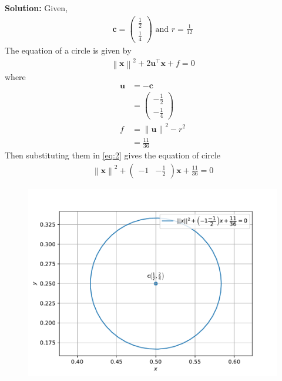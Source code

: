 \documentclass[12pt]{article}
\providecommand{\norm}[1]{\left\lVert#1\right\rVert}
\newcommand{\solution}{\noindent \textbf{Solution: }}
\newcommand{\myvec}[1]{\ensuremath{\begin{pmatrix}#1\end{pmatrix}}}
\let\vec\mathbf
\begin{document}
\begin{enumerate}
\solution Given,
		\begin{align}
			\vec{c}=\myvec{\frac{1}{2}\\[2pt] \frac{1}{4}}\text{ and }r=\frac{1}{12}
		\end{align}
		The equation of a circle is given by
		\begin{align}                                                                                          \norm{\vec{x}}^2 +2\vec{u}^\top\vec{x}+f=0 \label{eq:2}                                                                                  \end{align}
where
\begin{align}
	\vec{u}&=\vec{-c}\\
	&=\myvec{-\frac{1}{2}\\[2pt] -\frac{1}{4}}\\
	f&=\norm{\vec{u}}^2 -r^2\\
	&=\frac{11}{36}
\end{align}
		Then substituting them in \eqref{eq:2} gives the equation of circle
\begin{align}
	\norm{\vec{x}}^2 + \myvec{-1 & -\frac{1}{2}}\vec{x}+\frac{11}{36}=0
\end{align}
\begin{figure}[!h]
\begin{center}
\includegraphics[width=\columnwidth]{figs/fig.pdf}
\end{center}
\label{fig:Fig1}
\end{figure}
\end{enumerate}
\end{document}
